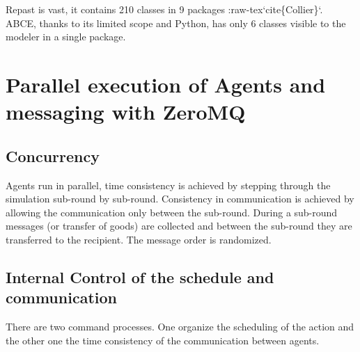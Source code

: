 \documentclass[letterpaper,10pt,english]{sphinxmanual}
\begin{document}
Repast is vast, it contains 210 classes in 9 packages
:raw-tex{}`cite\{Collier\}{}`. ABCE, thanks to its limited
scope and Python, has only 6 classes visible to the
modeler in a single package.


\chapter{Parallel execution of Agents and messaging with ZeroMQ}
\label{introduction:parallel-execution-of-agents-and-messaging-with-zeromq}

\section{Concurrency}
\label{introduction:concurrency}
Agents run in parallel, time consistency is achieved by
stepping through the simulation sub-round by sub-round.
Consistency in communication is achieved by allowing the
communication only between the sub-round. During a sub-round
messages (or transfer of goods) are collected
and between the sub-round they are transferred to the recipient.
The message order is randomized.


\section{Internal Control of the schedule and communication}
\label{introduction:internal-control-of-the-schedule-and-communication}
There are two command processes. One organize the scheduling of the action
and the other one the time consistency of the communication between agents.
\begin{figure}[htbp]
\centering

\end{figure}
\end{document}
